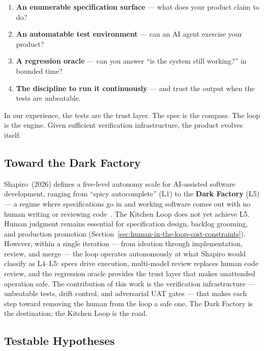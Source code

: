 \documentclass[11pt,a4paper]{article}
\providecommand{\tightlist}{%
  \setlength{\itemsep}{0pt}\setlength{\parskip}{0pt}}
\begin{document}
\begin{enumerate}
\def\labelenumi{\arabic{enumi}.}
\tightlist
\item
  \textbf{An enumerable specification surface} --- what does your product claim to do?
\item
  \textbf{An automatable test environment} --- can an AI agent exercise your product?
\item
  \textbf{A regression oracle} --- can you answer ``is the system still working?'' in bounded time?
\item
  \textbf{The discipline to run it continuously} --- and trust the output when the tests are unbeatable.
\end{enumerate}

In our experience, the tests are the trust layer. The spec is the compass. The loop is the engine. Given sufficient verification infrastructure, the product evolves itself.

\subsection{Toward the Dark Factory}\label{sec:toward-dark-factory}

Shapiro~(2026) defines a five-level autonomy scale for AI-assisted software development, ranging from ``spicy autocomplete'' (L1) to the \textbf{Dark Factory} (L5) --- a regime where specifications go in and working software comes out with no human writing or reviewing code~\cite{shapiro2026}. The Kitchen Loop does not yet achieve L5. Human judgment remains essential for specification design, backlog grooming, and production promotion (Section~\ref{sec:human-in-the-loop-cost-constraints}). However, within a single iteration --- from ideation through implementation, review, and merge --- the loop operates autonomously at what Shapiro would classify as L4--L5: specs drive execution, multi-model review replaces human code review, and the regression oracle provides the trust layer that makes unattended operation safe. The contribution of this work is the verification infrastructure --- unbeatable tests, drift control, and adversarial UAT gates --- that makes each step toward removing the human from the loop a safe one. The Dark Factory is the destination; the Kitchen Loop is the road.

\subsection{Testable Hypotheses}\label{sec:testable-hypotheses}
\end{document}
